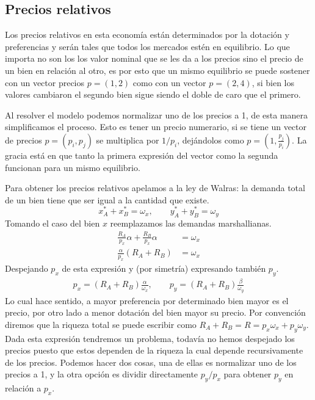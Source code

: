 \subsection{Precios relativos}

Los precios relativos en esta economía están determinados por la dotación y preferencias y serán tales que todos los mercados estén en equilibrio. Lo que importa no son los los valor nominal que se les da a los precios sino el precio de un bien en relación al otro, es por esto que un mismo equilibrio se puede sostener con un vector precios $p=(1,2)$ como con un vector $p=(2,4)$, si bien los valores cambiaron el segundo bien sigue siendo el doble de caro que el primero. 

Al resolver el modelo podemos normalizar uno de los precios a 1, de esta manera simplificamos el proceso. Esto es tener un precio numerario, si se tiene un vector de precios $p = (p_i,p_j)$ se multiplica por $1/p_i$, dejándolos como $p = (1, \frac{p_j}{p_i})$. La gracia está en que tanto la primera expresión del vector como la segunda funcionan para un mismo equilibrio.

Para obtener los precios relativos apelamos a la ley de Walras: la demanda total de un bien tiene que ser igual a la cantidad que existe.
\begin{equation*}
    x_A^* + x_B^* = \omega_x, \quad \quad y_A^* + y_B^* = \omega_y
\end{equation*}
Tomando el caso del bien $x$ reemplazamos las demandas marshallianas.
\begin{align*}
   \frac{R_A}{p_x} \alpha + \frac{R_B}{p_x} \alpha  &= \omega_x \\
   \frac{\alpha}{p_x} (R_A + R_B) &= \omega_x
\end{align*}
Despejando $p_x$ de esta expresión y (por simetría) expresando también $p_y$.
\begin{align*}
    p_x = (R_A + R_B)\frac{\alpha}{\omega_x}, \quad \quad p_y = (R_A + R_B)\frac{\beta}{\omega_y}
\end{align*}
Lo cual hace sentido, a mayor preferencia por determinado bien mayor es el precio, por otro lado a menor dotación del bien mayor su precio. Por convención diremos que la riqueza total se puede escribir como $R_A + R_B = R = p_x\omega_x + p_y\omega_y$. Dada esta expresión tendremos un problema, todavía no hemos despejado los precios puesto que estos dependen de la riqueza la cual depende recursivamente de los precios. Podemos hacer dos cosas, una de ellas es normalizar uno de los precios a 1, y la otra opción es dividir directamente $p_y/p_x$ para obtener $p_y$ en relación a $p_x$. 

